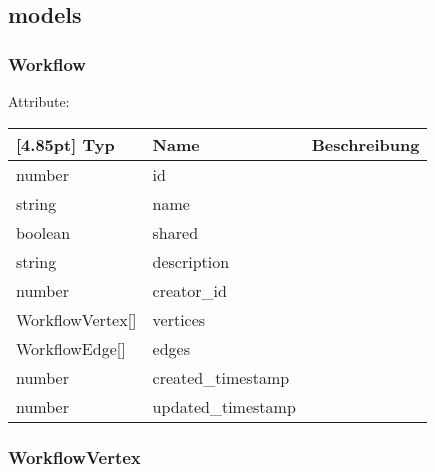         \subsection{models}
    
    		\subsubsection{Workflow}
    		
    		Attribute:
                \begin{center}
                	\renewcommand{\arraystretch}{1.5}
    	            \setlength\tabcolsep{5pt}
                	\begin{tabularx}{\textwidth}{|l|l|X|}
                		\hline
                        \rowcolor[gray]{0.75}[4.85pt]	
                	    Typ & Name & Beschreibung \\ \hline
                		number & id &  \\ \hline
                		string & name &  \\ \hline
                		boolean & shared &  \\ \hline
                		string & description &  \\ \hline
                		number & creator_id &  \\ \hline
                		WorkflowVertex[] & vertices &  \\ \hline
                		WorkflowEdge[] & edges &  \\ \hline
                		number & created_timestamp &  \\ \hline
                		number & updated_timestamp &  \\ \hline
                	\end{tabularx}
                \end{center}
                
    		\subsubsection{WorkflowVertex}
    		

